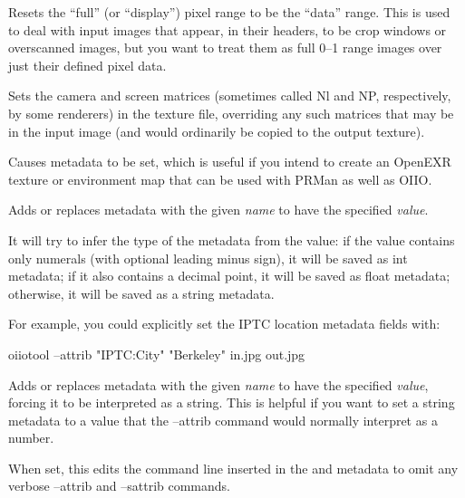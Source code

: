 Resets the ``full'' (or ``display'') pixel range to be the ``data''
range.  This is used to deal with input images that appear, in their
headers, to be crop windows or overscanned images, but you want to treat
them as full 0--1 range images over just their defined pixel data.
\apiend


Sets the camera and screen matrices (sometimes called {\cf Nl} and
{\cf NP}, respectively, by some renderers) in the texture file, 
overriding any such matrices that may be in the input image (and would
ordinarily be copied to the output texture).
\apiend

Causes metadata  to be set, which is useful if
you intend to create an OpenEXR texture or environment map that can be
used with PRMan as well as OIIO.
\apiend

Adds or replaces metadata with the given \emph{name} to have the
specified \emph{value}.

It will try to infer the type of the metadata from the value: if the
value contains only numerals (with optional leading minus sign), it will
be saved as {\cf int} metadata; if it also contains a decimal point, it
will be saved as {\cf float} metadata; otherwise, it will be saved as
a {\cf string} metadata.

For example, you could explicitly set the IPTC location metadata fields
with:
\begin{code}
        oiiotool --attrib "IPTC:City" "Berkeley" in.jpg out.jpg
\end{code}
\apiend

Adds or replaces metadata with the given \emph{name} to have the
specified \emph{value}, forcing it to be interpreted as a {\cf string}.
This is helpful if you want to set a {\cf string} metadata to a value
that the {\cf --attrib} command would normally interpret as a number.
\apiend

When set, this edits the command line inserted in the  and
 metadata to omit any verbose {\cf --attrib} and
{\cf --sattrib} commands.
\apiend

